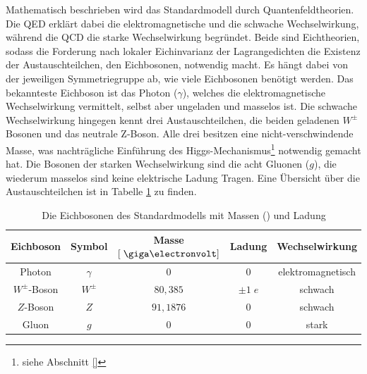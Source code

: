 Mathematisch beschrieben wird das Standardmodell durch Quantenfeldtheorien. Die
\ac{QED} erklärt dabei die elektromagnetische und die schwache Wechselwirkung,
während die \ac{QCD} die starke Wechselwirkung begründet. Beide sind
Eichtheorien, sodass die Forderung nach lokaler Eichinvarianz der
Lagrangedichten die Existenz der Austauschteilchen, den Eichbosonen, notwendig
macht. Es hängt dabei von der jeweiligen Symmetriegruppe ab, wie viele
Eichbosonen benötigt werden. Das bekannteste Eichboson ist das Photon
($\gamma$), welches die elektromagnetische Wechselwirkung vermittelt, selbst
aber ungeladen und masselos ist. Die schwache Wechselwirkung hingegen kennt
drei Austauschteilchen, die beiden geladenen $W^\pm$ Bosonen und das neutrale
Z-Boson. Alle drei besitzen eine nicht-verschwindende Masse, was nachträgliche
Einführung des Higgs-Mechanismus\footnote{siehe Abschnitt \ref{}}
notwendig gemacht hat. Die Bosonen der starken Wechselwirkung sind die acht
Gluonen ($g$), die wiederum masselos sind keine elektrische Ladung Tragen. Eine
Übersicht über die Austauschteilchen ist in Tabelle \ref{tab:bosons} zu finden.

\begin{table}
    \centering
    \begin{tabular}{|c|c|c|c|c|}
        \hline
        \bf{Eichboson} & \bf{Symbol} & \bf{Masse} $[\GeV]$ & \bf{Ladung} &
        \bf{Wechselwirkung} \\
        \hline\hline
        Photon        & $\gamma$ & $0$       & $0$        & elektromagnetisch \\
        $W^\pm$-Boson & $W^\pm$  & $80,385 $ & $\pm 1\;e$ & schwach \\
        $Z$-Boson     & $Z$      & $91,1876$ & $0$        & schwach \\
        Gluon         & $g$      & $0$       & $0$        & stark \\
        \hline
    \end{tabular}
    \caption[Die Eichbosonen des Standardmodells]
        {Die Eichbosonen des Standardmodells mit Massen
        (\cite{PhysRevD.86.010001}) und Ladung}
    \label{tab:bosons}
\end{table}

